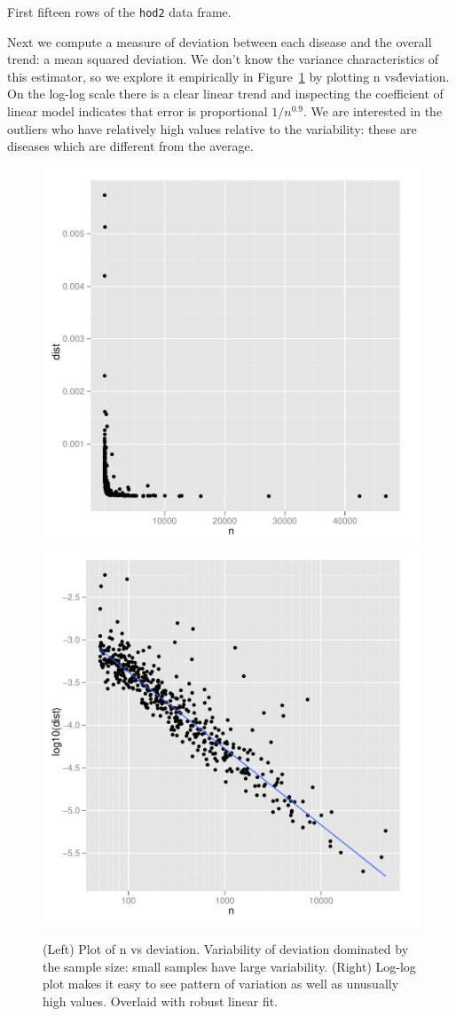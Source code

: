 \documentclass[oneside]{article}
\begin{document}
\begin{table}
  \centering
  
  \caption{First fifteen rows of the {\tt hod2} data frame.}
  \label{tbl:counts}
\end{table}

Next we compute a measure of deviation between each disease and the overall trend: a mean squared deviation. We don't know the variance characteristics of this estimator, so we explore it empirically in Figure~\ref{fig:deviation} by plotting n vs\. deviation. On the log-log scale there is a clear linear trend and inspecting the coefficient of linear model indicates that error is proportional $1 / n^0.9$. We are interested in the outliers who have relatively high values relative to the variability: these are diseases which are different from the average.

\begin{figure}[htbp]
  \centering
  \includegraphics[width=0.5\linewidth]{case-study/n-dist-raw.pdf}%
  \includegraphics[width=0.5\linewidth]{case-study/n-dist-log.pdf}
  \caption{(Left) Plot of n vs deviation. Variability of deviation dominated by the sample size: small samples have large variability. (Right) Log-log plot makes it easy to see pattern of variation as well as unusually high values.  Overlaid with robust linear fit.}
  \label{fig:deviation}
\end{figure}
\end{document}

